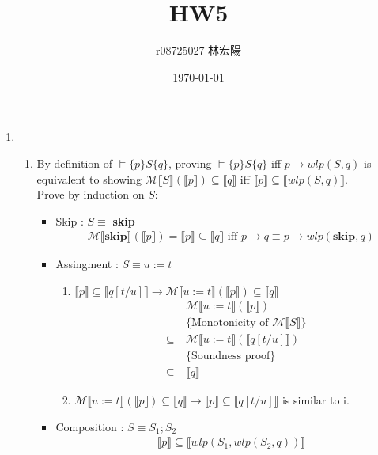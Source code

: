 \documentclass[11pt]{article}
\title{HW5}
\author{r08725027 林宏陽}
\date{\today}
\begin{document}
	\maketitle
	\begin{enumerate}
	\item 
		\begin{enumerate}
			\item By definition of $\models \{p\}S\{q\}$, proving $\models \{p\}S\{q\}$ iff $p \to wlp(S,q)$ is equivalent to showing $\mathcal{M}\llbracket S \rrbracket(\llbracket p \rrbracket) \subseteq \llbracket q \rrbracket$ iff $\llbracket p \rrbracket \subseteq \llbracket wlp(S, q) \rrbracket$.\\
			Prove by induction on $S$:
			\begin{itemize}
				\item Skip : $S\equiv$ \textbf{skip}
					\begin{align*}
						& \mathcal{M}\llbracket \textbf{skip} \rrbracket(\llbracket p \rrbracket) = \llbracket p \rrbracket \subseteq \llbracket q \rrbracket \text{ iff }  p \to q \equiv p \to wlp(\textbf{skip},q) 
					\end{align*}
				\item Assingment : $S\equiv u:=t$
				\begin{enumerate}
					\item $\llbracket p \rrbracket \subseteq \llbracket q[t/u] \rrbracket \to \mathcal{M}\llbracket u:=t \rrbracket(\llbracket p \rrbracket) \subseteq \llbracket q \rrbracket$
					\begin{align*}
						& \mathcal{M}\llbracket u:=t \rrbracket(\llbracket p \rrbracket)\\
						&\{\text{Monotonicity of $\mathcal{M}\llbracket S \rrbracket$}\}\\
						\subseteq~ & \mathcal{M}\llbracket u:=t \rrbracket(\llbracket q[t/u] \rrbracket)\\
						&\{\text{Soundness proof}\}\\
						\subseteq~ & \llbracket q \rrbracket
					\end{align*}
					\item $\mathcal{M}\llbracket u:=t \rrbracket(\llbracket p \rrbracket) \subseteq \llbracket q \rrbracket \to \llbracket p \rrbracket \subseteq \llbracket q[t/u] \rrbracket$ is similar to i.
				\end{enumerate}
				\item Composition : $S\equiv S_{1};S_{2}$
					\begin{align*}
						& \llbracket p \rrbracket \subseteq \llbracket wlp(S_{1}, wlp(S_{2}, q)) \rrbracket\\

\end{align*}
\end{itemize}
\end{enumerate}
\end{enumerate}
\end{document}
